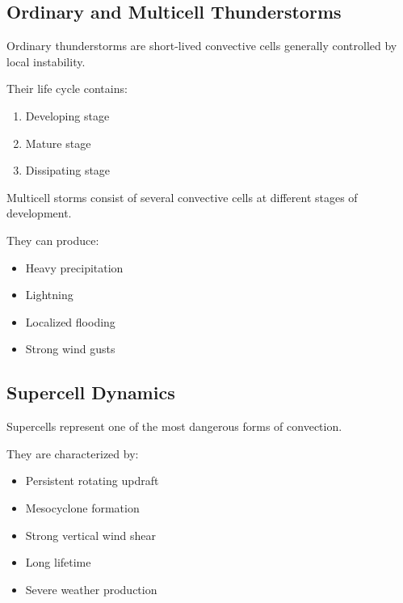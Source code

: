 
\subsection{Ordinary and Multicell Thunderstorms}

Ordinary thunderstorms are short-lived convective cells generally
controlled by local instability.

Their life cycle contains:

\begin{enumerate}

\item Developing stage

\item Mature stage

\item Dissipating stage

\end{enumerate}


Multicell storms consist of several convective cells at different stages
of development.

They can produce:

\begin{itemize}

\item Heavy precipitation

\item Lightning

\item Localized flooding

\item Strong wind gusts

\end{itemize}


\subsection{Supercell Dynamics}

Supercells represent one of the most dangerous forms of convection.

They are characterized by:

\begin{itemize}

\item Persistent rotating updraft

\item Mesocyclone formation

\item Strong vertical wind shear

\item Long lifetime

\item Severe weather production

\end{itemize}


